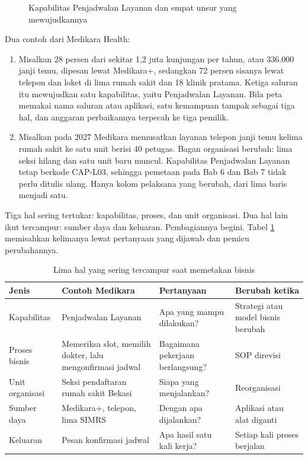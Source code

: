 \begin{figure}[!htb]
  \centering
  
  \caption{Kapabilitas Penjadwalan Layanan dan empat unsur yang mewujudkannya}
  \label{fig:ch05-kapabilitas}
\end{figure}

Dua contoh dari Medikara Health:

\begin{enumerate}
  \item Misalkan 28 persen dari sekitar 1,2 juta kunjungan per tahun, atau 336.000 janji temu,
        dipesan lewat Medikara+, sedangkan 72 persen sisanya lewat telepon dan loket di lima
        rumah sakit dan 18 klinik pratama.
        Ketiga saluran itu mewujudkan satu kapabilitas, yaitu Penjadwalan Layanan. Bila
        peta memakai nama saluran atau aplikasi, satu kemampuan tampak sebagai tiga hal,
        dan anggaran perbaikannya terpecah ke tiga pemilik.
  \item Misalkan pada 2027 Medikara memusatkan layanan telepon janji temu kelima rumah
        sakit ke satu unit berisi 40 petugas. Bagan organisasi berubah: lima seksi hilang
        dan satu unit baru muncul. Kapabilitas Penjadwalan Layanan tetap berkode CAP-L03,
        sehingga pemetaan pada Bab 6 dan Bab 7 tidak perlu ditulis ulang. Hanya kolom
        pelaksana yang berubah, dari lima baris menjadi satu.
\end{enumerate}

Tiga hal sering tertukar: kapabilitas, proses, dan unit organisasi. Dua hal lain ikut
tercampur: sumber daya dan keluaran. Pembagiannya begini. Tabel
\ref{tab:ch05-lima-jenis} memisahkan kelimanya lewat pertanyaan yang dijawab dan pemicu
perubahannya.

\begin{table}[!htb]
  \centering
  \caption{Lima hal yang sering tercampur saat memetakan bisnis}
  \label{tab:ch05-lima-jenis}
  \small
  \begin{tabularx}{\textwidth}{>{\raggedright\arraybackslash}p{2.0cm}>{\raggedright\arraybackslash}X>{\raggedright\arraybackslash}p{2.8cm}>{\raggedright\arraybackslash}p{2.9cm}}
    \hline
    \textbf{Jenis} & \textbf{Contoh Medikara} & \textbf{Pertanyaan} & \textbf{Berubah ketika} \\
    \hline
    Kapabilitas & Penjadwalan Layanan & Apa yang mampu dilakukan? & Strategi atau model bisnis berubah \\
    \hline
    Proses bisnis & Memeriksa slot, memilih dokter, lalu mengonfirmasi jadwal & Bagaimana pekerjaan berlangsung? & SOP direvisi \\
    \hline
    Unit organisasi & Seksi pendaftaran rumah sakit Bekasi & Siapa yang menjalankan? & Reorganisasi \\
    \hline
    Sumber daya & Medikara+, telepon, lima SIMRS & Dengan apa dijalankan? & Aplikasi atau alat diganti \\
    \hline
    Keluaran & Pesan konfirmasi jadwal & Apa hasil satu kali kerja? & Setiap kali proses berjalan \\
    \hline
  \end{tabularx}
\end{table}

